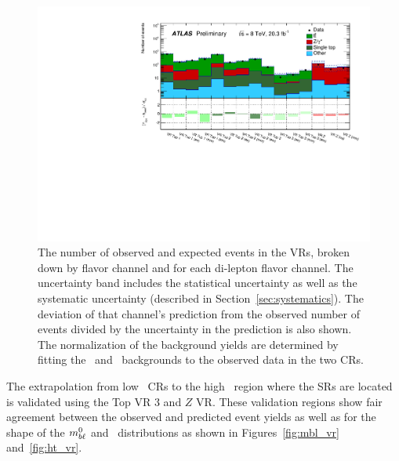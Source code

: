 \begin{figure}[ht]
\centering
\includegraphics[width=\textwidth]{figs/blstop/histpull_VR_detailed.pdf}
\caption{
  The number of observed and expected events in the VRs,
  broken down by flavor channel and for each di-lepton flavor channel.
  The uncertainty band includes the statistical uncertainty as well as the
  systematic uncertainty (described in Section~\ref{sec:systematics}).
  The deviation of that channel's prediction from the observed number of events
  divided by the uncertainty in the prediction is also shown.
  The normalization of the background yields are determined
  by fitting the \TTBAR\ and \ZGAMMAJETS\ backgrounds to the observed
  data in the two CRs.
}
\label{fig:pull_dist_vr}
\end{figure}

The extrapolation from low \HT\ CRs to the high \HT\ region
where the SRs are located is validated using the Top VR 3
and $Z$ VR. These validation regions show fair
agreement between the observed and predicted event yields as well as
for the shape of the $m_{b\ell}^{0}$ and \HT\ distributions as shown in
Figures~\ref{fig:mbl_vr} and~\ref{fig:ht_vr}.


